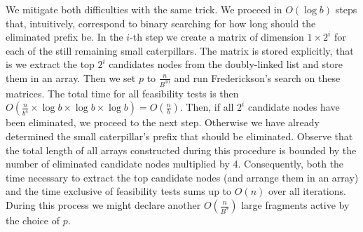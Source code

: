 \documentclass[11pt,a4paper]{article}
\theoremstyle{definition}
\theoremstyle{remark}
\begin{document}
We mitigate both difficulties with the same trick. We proceed in $O(\log b)$ steps that, intuitively, correspond
to binary searching for how long should the eliminated prefix be. In the $i$-th step we
create a matrix of dimension $1\times 2^{i}$ for each of the still remaining small caterpillars.
The matrix is stored explicitly, that is we extract the top $2^{i}$ candidates nodes from the doubly-linked
list and store them in an array. Then we set $p$ to $\frac{n}{B^{10}}$ and run Frederickson's search
on these matrices. The total time for all feasibility tests is then
$O(\frac{n}{b^{4}}\times \log b \times \log b \times \log b) = O(\frac{n}{b})$. 
Then, if all $2^{i}$ candidate nodes have been eliminated, we proceed to the next
step. Otherwise we have already determined the small caterpillar's prefix that should be eliminated.
Observe that the total length of all arrays constructed during this procedure is bounded by the number
of eliminated candidate nodes multiplied by 4. Consequently, both the time necessary
to extract the top candidate nodes (and arrange them in an array) and the time exclusive of feasibility tests sums up to $O(n)$
over all iterations. During this process we might declare another $O(\frac{n}{B^9})$ large fragments active
by the choice of $p$.
\end{document}
